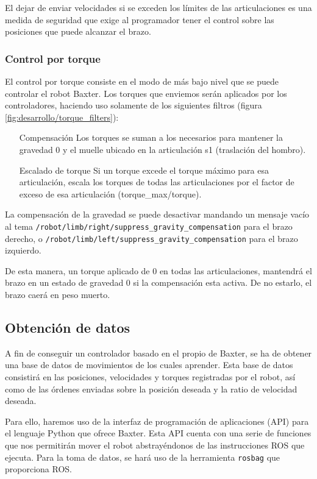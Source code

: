 El dejar de enviar velocidades si se exceden los límites de las articulaciones es una medida de seguridad que exige al programador tener el control sobre las posiciones que puede alcanzar el brazo.

\subsubsection{Control por torque}
El control por torque consiste en el modo de más bajo nivel que se puede controlar el robot Baxter. Los torques que enviemos serán aplicados por los controladores, haciendo uso solamente de los siguientes filtros (figura \ref{fig:desarrollo/torque_filters}):

\begin{enumerate}
\item [Compensación] Los torques se suman a los necesarios para mantener la gravedad 0 y el muelle ubicado en la articulación s1 (traslación del hombro).
\item [Escalado de torque] Si un torque excede el torque máximo para esa articulación, escala los torques de todas las articulaciones por el factor de exceso de esa articulación (torque\_max/torque).
\end{enumerate}

La compensación de la gravedad se puede desactivar mandando un mensaje vacío al tema \verb|/robot/limb/right/suppress_gravity_compensation| para el brazo derecho, o \verb|/robot/limb/left/suppress_gravity_compensation| para el brazo izquierdo.

De esta manera, un torque aplicado de 0 en todas las articulaciones, mantendrá el brazo en un estado de gravedad 0 si la compensación esta activa. De no estarlo, el brazo caerá en peso muerto.
	

\subsection{Obtención de datos}
A fin de conseguir un controlador basado en el propio de Baxter, se ha de obtener una base de datos de movimientos de los cuales aprender. Esta base de datos consistirá en las posiciones, velocidades y torques registradas por el robot, así como de las órdenes enviadas sobre la posición deseada y la ratio de velocidad deseada.

Para ello, haremos uso de la interfaz de programación de aplicaciones (API) para el lenguaje Python que ofrece Baxter. Esta API cuenta con una serie de funciones que nos permitirán mover el robot abstrayéndonos de las instrucciones ROS que ejecuta. Para la toma de datos, se hará uso de la herramienta \verb|rosbag| que proporciona ROS.

